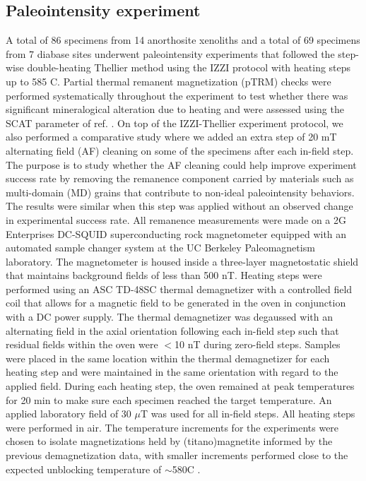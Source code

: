 \documentclass[9pt,twocolumn,twoside,lineno]{pnas-new}
\begin{document}
{\subsection*{Paleointensity experiment}
A total of 86 specimens from 14 anorthosite xenoliths and a total of 69 specimens from 7 diabase sites underwent paleointensity experiments that followed the step-wise double-heating Thellier method \cite{Thellier1959a} using the IZZI protocol \cite{Yu2004a} with heating steps up to 585 \textdegree C. Partial thermal remanent magnetization (pTRM) checks were performed systematically throughout the experiment to test whether there was significant mineralogical alteration due to heating and were assessed using the SCAT parameter of ref. \citealp{Shaar2013a}. On top of the IZZI-Thellier experiment protocol, we also performed a comparative study where we added an extra step of 20 mT alternating field (AF) cleaning on some of the specimens after each in-field step. The purpose is to study whether the AF cleaning could help improve experiment success rate by removing the remanence component carried by materials such as multi-domain (MD) grains that contribute to non-ideal paleointensity behaviors. The results were similar when this step was applied without an observed change in experimental success rate. All remanence measurements were made on a 2G Enterprises DC-SQUID superconducting rock magnetometer equipped with an automated sample changer system at the UC Berkeley Paleomagnetism laboratory. The magnetometer is housed inside a three-layer magnetostatic shield that maintains background fields of less than 500 nT. Heating steps were performed using an ASC TD-48SC thermal demagnetizer with a controlled field coil that allows for a magnetic field to be generated in the oven in conjunction with a DC power supply. The thermal demagnetizer was degaussed with an alternating field in the axial orientation following each in-field step such that residual fields within the oven were $<$10 nT during zero-field steps. Samples were placed in the same location within the thermal demagnetizer for each heating step and were maintained in the same orientation with regard to the applied field. During each heating step, the oven remained at peak temperatures for 20 min to make sure each specimen reached the target temperature. An applied laboratory field of 30 $\mu$T was used for all in-field steps. All heating steps were performed in air. The temperature increments for the experiments were chosen to isolate magnetizations held by (titano)magnetite informed by the previous demagnetization data, with smaller increments performed close to the expected unblocking temperature of $\sim$580\textdegree C \cite{Zhang2021b}. 

}
\end{document}
